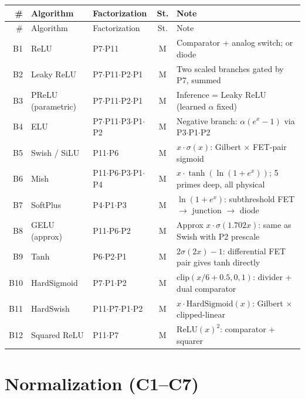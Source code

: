 \documentclass[10pt]{article}
\begin{document}
\begin{longtable}{rlp{3.0cm}cp{4.8cm}}
\toprule
\# & Algorithm & Factorization & St. & Note \\
\midrule
\endfirsthead
\toprule
\# & Algorithm & Factorization & St. & Note \\
\midrule
\endhead
\bottomrule
\endfoot
B1 & ReLU & P7$\cdot$P11 & M & Comparator + analog switch; or diode \\
B2 & Leaky ReLU & P7$\cdot$P11$\cdot$P2$\cdot$P1 & M & Two scaled branches gated by P7, summed \\
B3 & PReLU (parametric) & P7$\cdot$P11$\cdot$P2$\cdot$P1 & M & Inference = Leaky ReLU (learned $\alpha$ fixed) \\
B4 & ELU & P7$\cdot$P11$\cdot$P3$\cdot$P1$\cdot$P2 & M & Negative branch: $\alpha(e^x-1)$ via P3$\cdot$P1$\cdot$P2 \\
B5 & Swish / SiLU & P11$\cdot$P6 & M & $x \cdot \sigma(x)$: Gilbert $\times$ FET-pair sigmoid \\
B6 & Mish & P11$\cdot$P6$\cdot$P3$\cdot$P1$\cdot$P4 & M & $x \cdot \tanh(\ln(1+e^x))$; 5 primes deep, all physical \\
B7 & SoftPlus & P4$\cdot$P1$\cdot$P3 & M & $\ln(1+e^x)$: subthreshold FET $\to$ junction $\to$ diode \\
B8 & GELU (approx) & P11$\cdot$P6$\cdot$P2 & M & Approx $x \cdot \sigma(1.702x)$: same as Swish with P2 prescale \\
B9 & Tanh & P6$\cdot$P2$\cdot$P1 & M & $2\sigma(2x)-1$: differential FET pair gives tanh directly \\
B10 & HardSigmoid & P7$\cdot$P1$\cdot$P2 & M & $\mathrm{clip}(x/6+0.5,0,1)$: divider + dual comparator \\
B11 & HardSwish & P11$\cdot$P7$\cdot$P1$\cdot$P2 & M & $x \cdot \mathrm{HardSigmoid}(x)$: Gilbert $\times$ clipped-linear \\
B12 & Squared ReLU & P11$\cdot$P7 & M & $\mathrm{ReLU}(x)^2$: comparator + squarer \\
\end{longtable}

\section{Normalization (C1--C7)}
\end{document}
